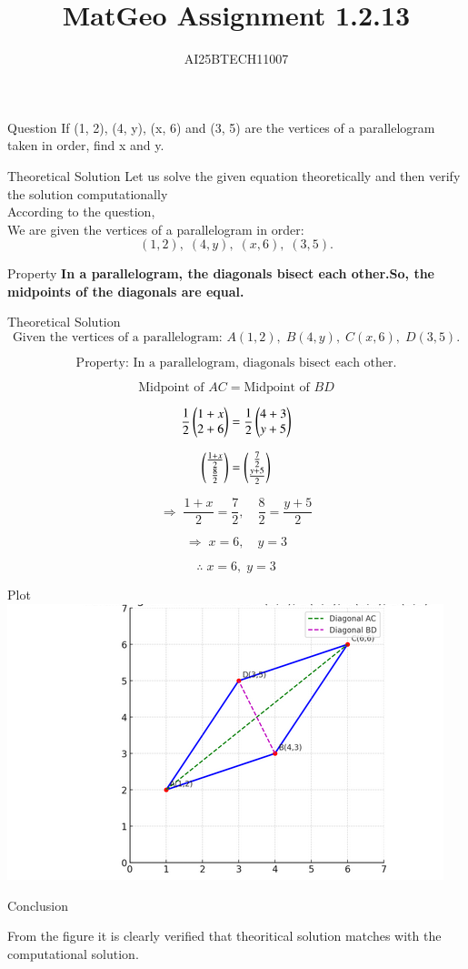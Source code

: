 \documentclass{beamer}
\title 
{MatGeo Assignment 1.2.13}
\author
{AI25BTECH11007}
\begin{document}
\frame{\titlepage}
\begin{frame}{Question}
If (1, 2), (4, y), (x, 6) and (3, 5) are the vertices of a parallelogram taken in order, find
x and y.\\
\end{frame}
\begin{frame}{Theoretical Solution}
\noindent
Let us solve the given equation theoretically and then verify the solution computationally \\
According to the question, \\

We are given the vertices of a parallelogram in order:
\[
(1,2), \; (4,y), \; (x,6), \; (3,5).
\]
\end{frame}

\begin{frame}{Property}
\textbf{In a parallelogram, the diagonals bisect each other.So, the midpoints of the diagonals are equal.}
\end{frame}
\begin{frame}{Theoretical Solution}
\[
\text{Given the vertices of a parallelogram: } 
A(1,2), \; B(4,y), \; C(x,6), \; D(3,5).
\]

\[
\text{Property: In a parallelogram, diagonals bisect each other.}
\]

\[
\text{Midpoint of } AC = \text{Midpoint of } BD
\]

\[
\frac{1}{2}
\begin{pmatrix}
1 + x \\
2 + 6
\end{pmatrix}
=
\frac{1}{2}
\begin{pmatrix}
4 + 3 \\
y + 5
\end{pmatrix}
\]

\[
\begin{pmatrix}
\frac{1+x}{2} \\
\frac{8}{2}
\end{pmatrix}
=
\begin{pmatrix}
\frac{7}{2} \\
\frac{y+5}{2}
\end{pmatrix}
\]

\[
\Rightarrow \; \frac{1+x}{2} = \frac{7}{2}, \quad \frac{8}{2} = \frac{y+5}{2}
\]

\[
\Rightarrow \; x = 6, \quad y = 3
\]

\[
\therefore \; x=6, \; y=3
\]

\end{frame}


\begin{frame}{Plot}
    \centering
    \includegraphics[width=\columnwidth, height=0.8\textheight, keepaspectratio]{figs/fig1.png} 
    \label{The visual of the parallelogram with vertices labeled and diagonals shown}
\end{frame}

\begin{frame}{Conclusion}
    

From the figure it is clearly verified that theoritical solution matches with the computational solution.
\end{frame}
\end{document}
